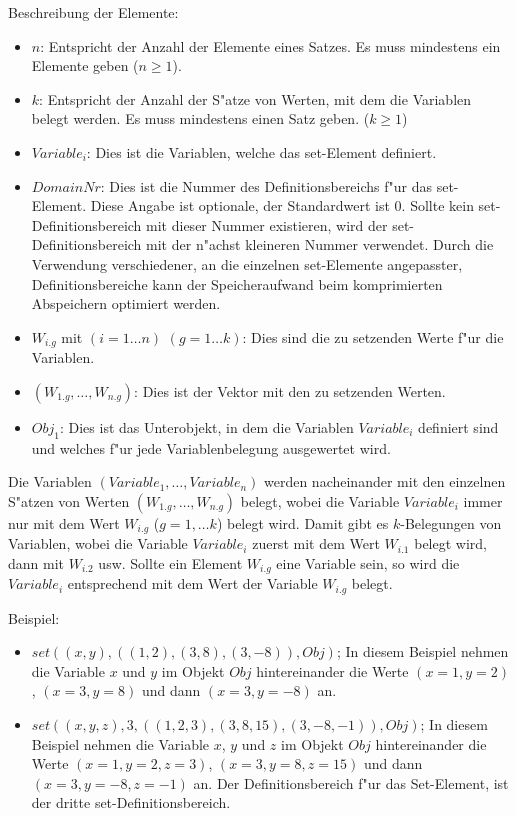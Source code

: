 \bigskip\noindent
Beschreibung der Elemente:
\begin{itemize}
 \item $n$: Entspricht der Anzahl der Elemente eines Satzes. Es muss mindestens ein Elemente geben ($n \geq 1$).
 \item $k$: Entspricht der Anzahl der S"atze von Werten, mit dem die Variablen belegt werden. Es muss mindestens einen Satz geben. ($k \geq 1$)
 \item $Variable_i$: Dies ist die Variablen, welche das set-Element definiert.
 \item $DomainNr$: Dies ist die Nummer des Definitionsbereichs f"ur das set-Element. Diese Angabe ist optionale, der Standardwert ist 0. Sollte kein set-Definitionsbereich mit dieser Nummer existieren, wird der set-Definitionsbereich mit der n"achst kleineren Nummer verwendet. Durch die Verwendung verschiedener, an die einzelnen set-Elemente angepasster, Definitionsbereiche kann der Speicheraufwand beim komprimierten Abspeichern optimiert werden.
 \item $W_{i.g}$ mit $(i = 1 \ldots n)$ $(g = 1 \ldots k)$: Dies sind die zu setzenden Werte f"ur die Variablen.
 \item $(W_{1.g}, \ldots, W_{n.g})$: Dies ist der Vektor mit den zu setzenden Werten.
 \item $Obj_1$: Dies ist das Unterobjekt, in dem die Variablen $Variable_i$ definiert sind und welches f"ur jede Variablenbelegung ausgewertet wird.
\end{itemize}

Die Variablen $(Variable_1, \ldots, Variable_n)$ werden nacheinander mit den einzelnen S"atzen von Werten $(W_{1.g}, \ldots, W_{n.g})$ belegt, wobei die Variable $Variable_i$ immer nur mit dem Wert $W_{i.g}$ ($g=1, \ldots k$) belegt wird. Damit gibt es $k$-Belegungen von Variablen, wobei die Variable $Variable_i$ zuerst mit dem Wert $W_{i.1}$ belegt wird, dann mit $W_{i.2}$ usw. Sollte ein Element $W_{i.g}$ eine Variable sein, so wird die $Variable_i$ entsprechend mit dem Wert der Variable $W_{i.g}$ belegt.

\bigskip\noindent
Beispiel:
\begin{itemize}
 \item $set( (x, y),( (1, 2), (3, 8), (3, -8) ), Obj)$; In diesem Beispiel nehmen die Variable $x$ und $y$ im Objekt $Obj$ hintereinander die Werte $(x=1, y=2)$, $(x=3, y=8)$ und dann $(x=3, y=-8)$ an.
 \item $set( (x, y, z), 3,( (1, 2, 3), (3, 8, 15), (3,-8,-1) ), Obj)$; In diesem Beispiel nehmen die Variable $x$, $y$ und $z$ im Objekt $Obj$ hintereinander die Werte $(x=1, y=2, z=3)$, $(x=3, y=8, z=15)$ und dann $(x=3, y=-8, z=-1)$ an. Der Definitionsbereich f"ur das Set-Element, ist der dritte set-Definitionsbereich.
\end{itemize}

